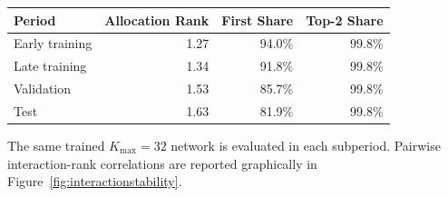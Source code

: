 \begin{threeparttable}
\begin{tabular}{lrrr}
\toprule
Period & Allocation Rank & First Share & Top-2 Share \\
\midrule
Early training & 1.27 & 94.0\% & 99.8\% \\
Late training & 1.34 & 91.8\% & 99.8\% \\
Validation & 1.53 & 85.7\% & 99.8\% \\
Test & 1.63 & 81.9\% & 99.8\% \\
\bottomrule
\end{tabular}
\begin{tablenotes}\footnotesize\item The same trained $K_{\max}=32$ network is evaluated in each subperiod. Pairwise interaction-rank correlations are reported graphically in Figure~\ref{fig:interactionstability}.\end{tablenotes}
\end{threeparttable}
